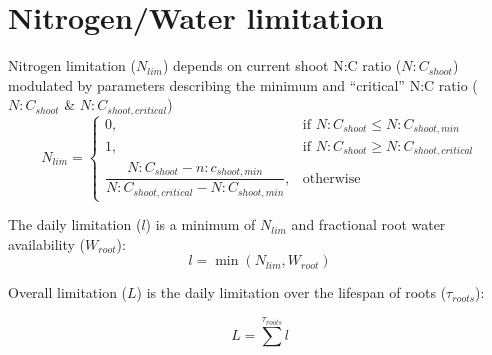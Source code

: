 \section{Nitrogen/Water limitation}

Nitrogen limitation ($N_{lim}$) depends on current shoot N:C ratio ($N:C_{shoot}$) modulated by parameters describing the minimum and ``critical'' N:C ratio ($N:C_{shoot}$ \& $N:C_{shoot,critical}$)
\begin{equation}
	N_{lim}=
	\begin{cases}
	    0,& \text{if } N:C_{shoot}\le N:C_{shoot,min} \\
	    1,& \text{if } N:C_{shoot}\ge N:C_{shoot,critical} \\
	    \dfrac{N:C_{shoot} - n:c_{shoot,min}}{N:C_{shoot,critical} - N:C_{shoot,min}},& \text{otherwise}
	\end{cases}
	\label{equ:lim1}
\end{equation}

The daily limitation  ($l$) is a minimum of $N_{lim}$ and fractional root water availability ($W_{root}$):
\begin{equation}
	l = \min (N_{lim}, W_{root})
\end{equation}

Overall limitation ($L$) is the daily limitation over the lifespan of roots ($\tau_{roots}$):

\begin{equation}
	L = \sum^{\tau_{roots}} l
	\label{equ:limN}
\end{equation}
